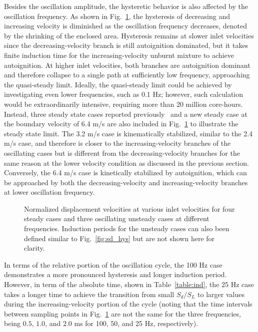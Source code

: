 \documentclass[review,3p,times]{elsarticle}
\begin{document}
\textcolor{Rev1}{Besides the oscillation amplitude, the hysteretic behavior is also affected by the oscillation frequency.}  As shown in Fig.~\ref{fig:sd_hys_frq}, the hysteresis of decreasing and increasing velocity is diminished as the oscillation frequency decreases, denoted by the shrinking of the enclosed area.  Hysteresis remains at slower inlet velocities since the decreasing-velocity branch is still autoignition dominated, but it takes finite induction time for the increasing-velocity unburnt mixture to achieve autoignition.  At higher inlet velocities, both branches are autoignition dominant and therefore collapse to a single path at sufficiently low frequency, approaching the quasi-steady limit.  \textcolor{Rev1}{Ideally, the quasi-steady limit could be achieved by investigating even lower frequencies, such as 0.1 Hz; however, such calculation would be extraordinarily intensive, requiring more than 20 million core-hours.  Instead, three steady state cases reported previously~\cite{deng15b} and a new steady case at the boundary velocity of 6.4 m/s are also included in Fig.~\ref{fig:sd_hys_frq} to illustrate the steady state limit.  The 3.2 m/s case is kinematically stabilized, similar to the 2.4 m/s case, and therefore is closer to the increasing-velocity branches of the oscillating cases but is different from the decreasing-velocity branches for the same reason at the lower velocity condition as discussed in the previous section.  Conversely, the 6.4 m/s case is kinetically stabilized by autoignition, which can be approached by both the decreasing-velocity and increasing-velocity branches at lower oscillation frequency.}  

\begin{figure}[t]
  \centering
  \scriptsize
  \resizebox{0.5\textwidth}{!}{}
  \normalsize
  \vspace{-0.2in}
  \caption{\textcolor{Rev1}{Normalized displacement velocities at various inlet velocities for four steady cases and three oscillating unsteady cases at different frequencies.  Induction periods for the unsteady cases can also been defined similar to Fig.~\ref{fig:sd_hys} but are not shown here for clarity.}}
  \label{fig:sd_hys_frq}
\end{figure}

\textcolor{Rev1}{In terms of the relative portion of the oscillation cycle, the 100 Hz case demonstrates a more pronounced hysteresis and longer induction period.  However, in term of the absolute time, shown in Table~\ref{table:ind}, the 25 Hz case takes a longer time to achieve the transition from small $S_d/S_L$ to larger values during the increasing-velocity portion of the cycle (noting that the time intervals between sampling points in Fig.~\ref{fig:sd_hys_frq} are not the same for the three frequencies, being $0.5$, $1.0$, and $2.0$ ms for 100, 50, and 25 Hz, respectively).}
\end{document}
